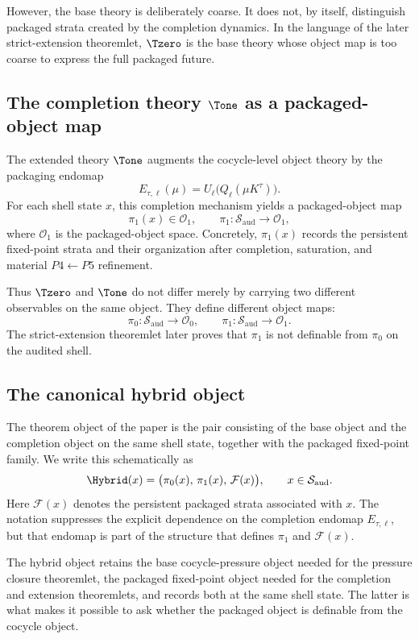 However, the base theory is deliberately coarse. It does not, by itself, distinguish packaged strata created by the completion dynamics. In the language of the later strict-extension theoremlet, \(\Tzero\) is the base theory whose object map is too coarse to express the full packaged future.

\subsection{The completion theory \texorpdfstring{$\Tone$}{T1} as a packaged-object map}

The extended theory \(\Tone\) augments the cocycle-level object theory by the packaging endomap \cite{TsiokosCreateStone,TsiokosFoundations}
\[
E_{\tau,\ell}(\mu)=U_{\ell}\!\bigl(Q_{\ell}(\mu K^{\tau})\bigr).
\]
For each shell state \(x\), this completion mechanism yields a packaged-object map
\[
\pi_1(x)\in \mathcal{O}_1,
\qquad
\pi_1:\mathcal{S}_{\mathrm{aud}}\to \mathcal{O}_1,
\]
where \(\mathcal{O}_1\) is the packaged-object space. Concretely, \(\pi_1(x)\) records the persistent fixed-point strata and their organization after completion, saturation, and material \(P4\leftarrow P5\) refinement.

Thus \(\Tzero\) and \(\Tone\) do not differ merely by carrying two different observables on the same object. They define different object maps:
\[
\pi_0:\mathcal{S}_{\mathrm{aud}}\to \mathcal{O}_0,
\qquad
\pi_1:\mathcal{S}_{\mathrm{aud}}\to \mathcal{O}_1.
\]
The strict-extension theoremlet later proves that \(\pi_1\) is not definable from \(\pi_0\) on the audited shell.

\subsection{The canonical hybrid object}

The theorem object of the paper is the pair consisting of the base object and the completion object on the same shell state, together with the packaged fixed-point family. We write this schematically as
\[
\Hybrid(x)
=
\bigl(\pi_0(x),\,\pi_1(x),\,\mathcal{F}(x)\bigr),
\qquad x\in \mathcal{S}_{\mathrm{aud}}.
\]
Here \(\mathcal{F}(x)\) denotes the persistent packaged strata associated with \(x\). The notation suppresses the explicit dependence on the completion endomap \(E_{\tau,\ell}\), but that endomap is part of the structure that defines \(\pi_1\) and \(\mathcal{F}(x)\).

The hybrid object retains the base cocycle-pressure object needed for the pressure closure theoremlet, the packaged fixed-point object needed for the completion and extension theoremlets, and records both at the same shell state. The latter is what makes it possible to ask whether the packaged object is definable from the cocycle object.

